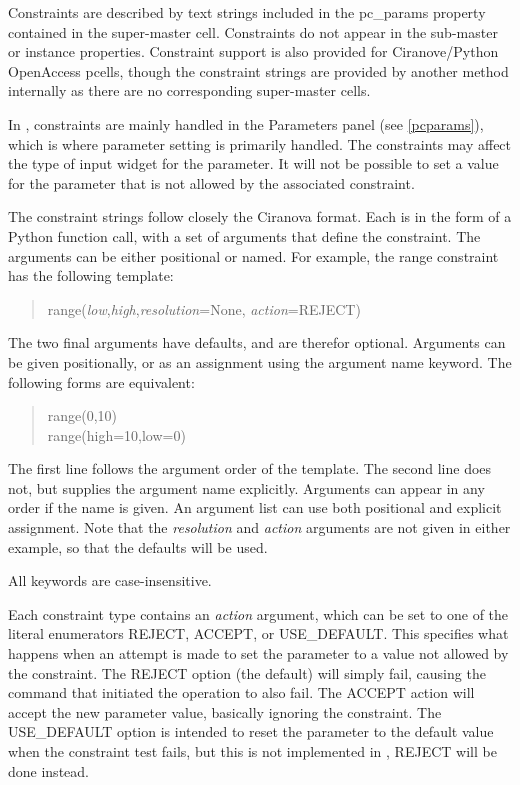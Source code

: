 Constraints are described by text strings included in the {\et
pc\_params} property contained in the super-master cell.  Constraints
do not appear in the sub-master or instance properties.
Constraint support is also provided for Ciranove/Python OpenAccess
pcells, though the constraint strings are provided by another method
internally as there are no corresponding super-master {\Xic} cells.

In {\Xic}, constraints are mainly handled in the {\cb Parameters}
panel (see \ref{pcparams}), which is where parameter setting is
primarily handled.  The constraints may affect the type of input
widget for the parameter.  It will not be possible to set a value for
the parameter that is not allowed by the associated constraint.

The constraint strings follow closely the Ciranova format.  Each is in
the form of a Python function call, with a set of arguments that
define the constraint.  The arguments can be either positional or
named.  For example, the {\vt range} constraint has the following
template:

\begin{quote}
{\vt range(}{\it low\/},{\it high\/},{\it resolution\/}={\vt None},{\it
 action\/}={\vt REJECT)}
\end{quote}

The two final arguments have defaults, and are therefor optional. 
Arguments can be given positionally, or as an assignment using the
argument name keyword.  The following forms are equivalent:

\begin{quote} \vt
range(0,10)\\
range(high=10,low=0)
\end{quote}

The first line follows the argument order of the template.  The second
line does not, but supplies the argument name explicitly.  Arguments
can appear in any order if the name is given.  An argument list can
use both positional and explicit assignment.  Note that the {\it
resolution} and {\it action} arguments are not given in either
example, so that the defaults will be used.

All keywords are case-insensitive.

Each constraint type contains an {\it action} argument, which can be
set to one of the literal enumerators {\vt REJECT}, {\vt ACCEPT}, or
{\vt USE\_DEFAULT}.  This specifies what happens when an attempt is
made to set the parameter to a value not allowed by the constraint. 
The {\vt REJECT} option (the default) will simply fail, causing the
command that initiated the operation to also fail.  The {\vt ACCEPT}
action will accept the new parameter value, basically ignoring the
constraint.  The {\vt USE\_DEFAULT} option is intended to reset the
parameter to the default value when the constraint test fails, but
this is not implemented in {\Xic}, {\vt REJECT} will be done instead.


